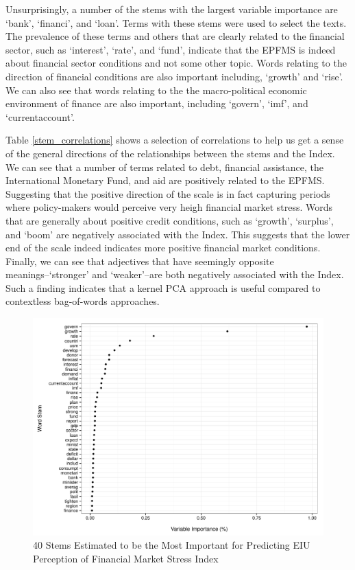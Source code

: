 \documentclass[]{article}
\begin{document}
Unsurprisingly, a number of the stems with the largest variable importance are `bank', `financi', and `loan'. Terms with these stems were used to select the texts. The prevalence of these terms and others that are clearly related to the financial sector, such as `interest', `rate', and `fund', indicate that the EPFMS is indeed about financial sector conditions and not some other topic. Words relating to the direction of financial conditions are also important including, `growth' and `rise'. We can also see that words relating to the the macro-political economic environment of finance are also important, including `govern', `imf', and `currentaccount'.

Table \ref{stem_correlations} shows a selection of correlations to help us get a sense of the general directions of the relationships between the stems and the Index. We can see that a number of terms related to debt, financial assistance, the International Monetary Fund, and aid are positively related to the EPFMS. Suggesting that the positive direction of the scale is in fact capturing periods where policy-makers would perceive very heigh financial market stress. Words that are generally about positive credit conditions, such as `growth', `surplus', and `boom' are negatively associated with the Index. This suggests that the lower end of the scale indeed indicates more positive financial market conditions. Finally, we can see that adjectives that have seemingly opposite meanings--`stronger' and `weaker'--are both negatively associated with the Index. Such a finding indicates that a kernel PCA approach is useful compared to contextless bag-of-words approaches.

\begin{figure}
    \caption{40 Stems Estimated to be the Most Important for Predicting EIU Perception of Financial Market Stress Index}
    \label{rf_importance}

    \begin{center}
        \includegraphics[scale=0.5]{analysis/figures/rf_stem_importance.pdf}
    \end{center}

\end{figure}
\end{document}
